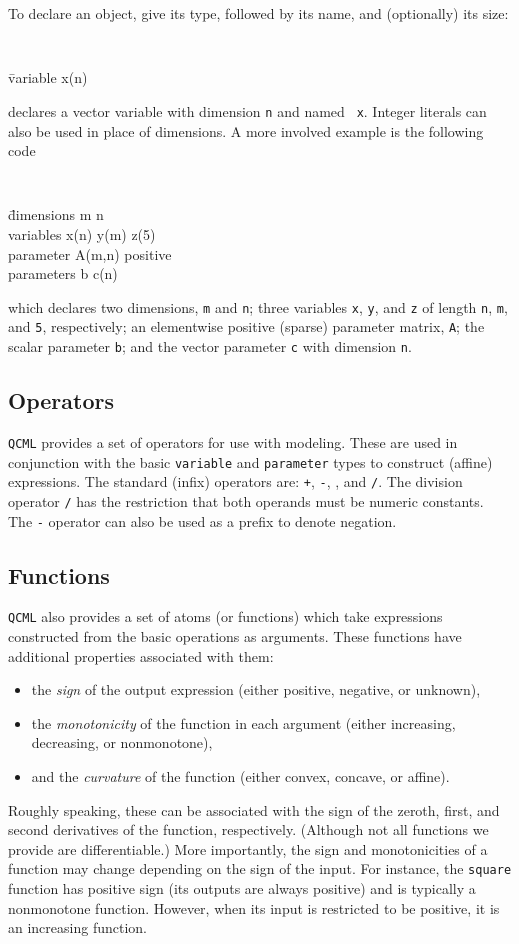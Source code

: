 \documentclass[11pt]{article}
\def\qcml{\texttt{QCML}\xspace}
\begin{document}
To declare an object, give its type, followed by its name, and (optionally) 
its size:
{\tt
\begin{tabbing}
  \qquad \= variable x(n)
\end{tabbing}}
\noindent declares a vector variable with dimension {\tt n} and named {\tt
x}. Integer literals can also be used in place of dimensions. A more involved
example is the following code
{\tt
\begin{tabbing}
  \qquad \= dimensions m n \\
  \> variables x(n) y(m) z(5)\\
  \> parameter A(m,n) positive \\
  \> parameters b c(n)
\end{tabbing}}
\noindent which declares two dimensions, {\tt m} and {\tt n}; three variables
{\tt x}, {\tt y}, and {\tt z} of length {\tt n}, {\tt m}, and {\tt 5},
respectively; an elementwise positive (sparse) parameter matrix, {\tt A}; the
scalar parameter {\tt b}; and the vector parameter {\tt c} with dimension
{\tt n}.

\subsection{Operators}
\qcml provides a set of operators for use with modeling. These are used in
conjunction with the basic {\tt variable} and {\tt parameter} types to
construct (affine) expressions. The standard (infix) operators are: {\tt +},
{\tt -}, {\tt *}, and {\tt /}. The division operator {\tt /} has the
restriction that both operands must be numeric constants. The {\tt -}
operator can also be used as a prefix to denote negation.

\subsection{Functions}
\qcml also provides a set of atoms (or functions) which take expressions constructed from the basic operations as arguments. These functions have additional properties associated with them:
\begin{itemize}
\item the \emph{sign} of the output expression (either positive, negative, or unknown),
\item the \emph{monotonicity} of the function in each argument (either increasing, decreasing, or nonmonotone),
\item and the \emph{curvature} of the function (either convex, concave, or affine).
\end{itemize}
Roughly speaking, these can be associated with the sign of the zeroth, first, and second derivatives of the function, respectively. (Although not all functions we provide are differentiable.) More importantly, the sign and monotonicities of a function may change depending on the sign of the input. For instance, the {\tt square} function has positive sign (its outputs are always positive) and is typically a nonmonotone function. However, when its input is restricted to be positive, it is an increasing function.
\end{document}

